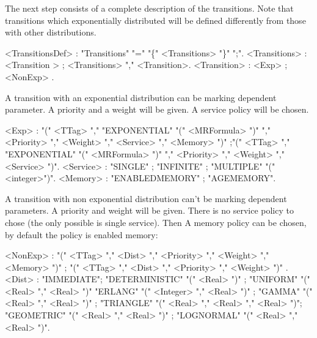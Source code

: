\documentclass[a4paper]{article}
\begin{document}
The next step consists of a complete description of the transitions. Note that transitions
which  exponentially  distributed will be defined differently from  those with other distributions.
\begin{grammar}
[(colon){$::=$ }]
[(semicolon){$|$ }]
[(period){\\ }]
[(quote){"}{" }]
[(nonterminal){$\langle$}{$\rangle$ }]
<TransitionsDef> : "Transitions" "=" "\{" <Transitions> "\}" ";".
<Transitions> : <Transition > ; <Transitions> "," <Transition>.
<Transition> : <Exp> ; <NonExp> .
\end{grammar}

A transition with an exponential distribution can be marking dependent parameter. 
A priority and a weight will be given. A service policy will be chosen. 
\begin{grammar}
[(colon){$::=$ }]
[(semicolon){$|$ }]
[(period){\\ }]
[(quote){"}{" }]
[(nonterminal){$\langle$}{$\rangle$ }]
<Exp> : "(" <TTag> "," "EXPONENTIAL" "(" <MRFormula> ")" "," <Priority> "," <Weight>  "," <Service> "," <Memory>  ")"
;"(" <TTag> "," "EXPONENTIAL" "(" <MRFormula> ")" "," <Priority> "," <Weight>  "," <Service> ")".
<Service> : "SINGLE" ; "INFINITE" ; "MULTIPLE" "("<integer>")".
<Memory> :  "ENABLEDMEMORY" ; "AGEMEMORY".
\end{grammar}

A transition with non exponential distribution can't be marking dependent parameters. 
A priority and weight will be given. There is no service policy to chose (the only possible is single service). 
Then  A memory policy can be chosen, by default the policy is enabled memory:  
\begin{grammar}
[(colon){$::=$ }]
[(semicolon){$|$ }]
[(period){\\ }]
[(quote){"}{" }]
[(nonterminal){$\langle$}{$\rangle$ }]
<NonExp> :  "(" <TTag> "," <Dist> "," <Priority> "," <Weight> "," <Memory>  ")" ; 
"(" <TTag> "," <Dist> "," <Priority> "," <Weight>  ")" .
<Dist> : "IMMEDIATE"; "DETERMINISTIC" "(" <Real> ")" ; "UNIFORM" "(" <Real> "," <Real> ")"
"ERLANG" "(" <Integer> "," <Real> ")" ; "GAMMA" "(" <Real> "," <Real> ")" ; "TRIANGLE" "(" <Real> "," <Real> "," <Real> ")"; 
"GEOMETRIC" "(" <Real> "," <Real> ")" ; "LOGNORMAL" "(" <Real> "," <Real> ")".
\end{grammar}
\end{document}
